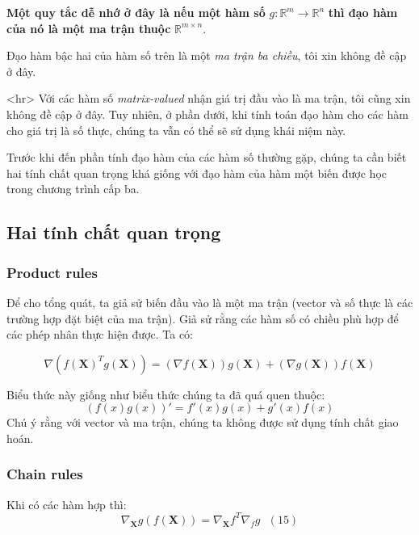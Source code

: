 \documentclass[12pt]{article}
\begin{document}
 
\textbf{Một quy tắc dễ nhớ ở đây là nếu một hàm số} $g: \mathbb{R}^m \rightarrow \mathbb{R}^n$ \textbf{thì đạo hàm của nó là một ma trận thuộc} $\mathbb{R}^{m \times n}$. 
 
Đạo hàm bậc hai của hàm số trên là một \textit{ma trận ba chiều}, tôi xin không đề cập ở đây.  
 

<hr> 
Với các hàm số \textit{matrix-valued} nhận giá trị đầu vào là ma trận, tôi cũng xin không đề cập ở đây. Tuy nhiên, ở phần dưới, khi tính toán đạo hàm cho các hàm cho giá trị là số thực, chúng ta vẫn có thể sẽ sử dụng khái niệm này. 
 
Trước khi đến phần tính đạo hàm của các hàm số thường gặp, chúng ta cần biết hai tính chất quan trọng khá giống với đạo hàm của hàm một biến được học trong chương trình cấp ba.  
 
 
\subsection{Hai tính chất quan trọng }
 
 
\subsubsection{Product rules}
Để cho tổng quát, ta giả sử biến đầu vào là một ma trận (vector và số thực là các trường hợp đặt biệt của ma trận). Giả sử rằng các hàm số có chiều phù hợp để các phép nhân thực hiện được. Ta có:  
 
\begin{equation} 
\label{eqn:productrules}
\nabla\left( f(\mathbf{X})^Tg(\mathbf{X}) \right) = \left(\nabla f(\mathbf{X})\right) g(\mathbf{X}) + \left(\nabla g(\mathbf{X})\right) f(\mathbf{X})  
\end{equation} 
 
Biểu thức này giống như biểu thức chúng ta đã quá quen thuộc: 
\begin{equation*} 
\left(f(x)g(x)\right)' = f'(x)g(x) + g'(x)f(x) 
\end{equation*} 
Chú ý rằng với vector và ma trận, chúng ta không được sử dụng tính chất giao hoán.  
 
 
\subsubsection{Chain rules }
Khi có các hàm hợp thì: 
\begin{equation} 
\label{eqn:chainrules}
\nabla_{\mathbf{X}} g(f(\mathbf{X})) = \nabla_{\mathbf{X}} f^T \nabla_{f}g ~~~ (15) 
\end{equation} 
 
\end{document}
